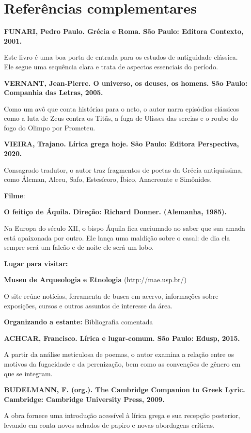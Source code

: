 \documentclass[12pt]{extarticle}
\begin{document}
\section{Referências complementares}

\textbf{FUNARI, Pedro Paulo. Grécia e Roma. São Paulo: Editora Contexto,
2001.}

Este livro é uma boa porta de entrada para os estudos de antiguidade
clássica. Ele segue uma sequência clara e trata de aspectos essenciais
do período.

\textbf{VERNANT, Jean-Pierre. O universo, os deuses, os homens. São
Paulo: Companhia das Letras, 2005.}

Como um avô que conta histórias para o neto, o autor narra episódios
clássicos como a luta de Zeus contra os Titãs, a fuga de Ulisses das
sereias e o roubo do fogo do Olimpo por Prometeu.

\textbf{VIEIRA, Trajano. Lírica grega hoje. São Paulo: Editora
Perspectiva, 2020.}

Consagrado tradutor, o autor traz fragmentos de poetas da Grécia
antiquíssima, como Álcman, Alceu, Safo, Estesícoro, Íbico, Anacreonte e
Simônides.

\textbf{Filme}:

\textbf{O feitiço de Áquila. Direção: Richard Donner. (Alemanha, 1985).}

Na Europa do século XII, o bispo Áquila fica enciumado ao saber que sua
amada está apaixonada por outro. Ele lança uma maldição sobre o casal:
de dia ela sempre será um falcão e de noite ele será um lobo.

\textbf{Lugar para visitar:}

\textbf{Museu de Arqueologia e Etnologia} (http://mae.usp.br/)

O site reúne notícias, ferramenta de busca em acervo, informações sobre
exposições, cursos e outros assuntos de interesse da área.

\textbf{Organizando a estante:} Bibliografia comentada

\textbf{ACHCAR, Francisco. Lírica e lugar-comum. São Paulo: Edusp,
2015.}

A partir da análise meticulosa de poemas, o autor examina a relação
entre os motivos da fugacidade e da perenização, bem como as convenções
de gênero em que se integram.

\textbf{BUDELMANN, F. (org.). The Cambridge Companion to Greek Lyric.
Cambridge: Cambridge University Press, 2009.}

A obra fornece uma introdução acessível à lírica grega e sua recepção
posterior, levando em conta novos achados de papiro e novas abordagens
críticas.
\end{document}
